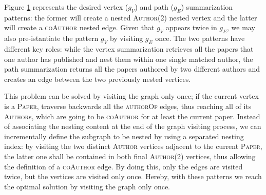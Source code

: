 \begin{example}
\begin{figure}[!t]
	\label{fig:patterns}
\end{figure}
	Figure \ref{fig:patterns} represents the desired vertex ($g_V$) and path ($g_E$) summarization patterns: the former will create a nested \textsc{Author}(2) nested vertex and the latter will create a \textsc{coAuthor} nested edge. Given that $g_V$ appears twice in $g_E$, we may also pre-istantiate the pattern $g_V$ by visiting $g_E$ once. The two patterns have different key roles: while the vertex summarization retrieves all the papers that one author has published and nest them within one single matched author, the path summarization returns all the papers authored by two different authors and creates an edge between the two previously nested vertices. %
	
	
	This problem can be solved by visiting the graph only once; %
	if the current vertex is a \textsc{Paper}, traverse backwards all the \textsc{authorOf} edges, thus reaching all of its \textsc{Author}s, which are going to be \textsc{coAuthor} for at least the current paper. Instead of associating the nesting content at the end of the graph visiting process, we can incrementally define the subgraph to be nested by using a separated nesting index: by visiting the two distinct \textsc{Author} vertices adjacent to the current \textsc{Paper}, the latter one shall  be contained in both final \textsc{Author}(2) vertices, thus allowing the definition of a  \textsc{coAuthor} edge. %
	By doing this, only the edges are visited twice, but the vertices are visited only once. Hereby, with these patterns we reach the optimal solution by visiting the graph only once.
	
\end{example}


